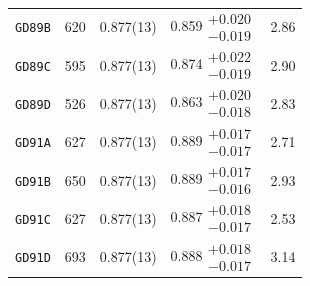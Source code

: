 \begin{table}
{\begin{tabular}{lcccc}
		\texttt{GD89B}	&	620 	&	0.877(13)	&	0.859$\substack{+0.020\\-0.019}$	&	2.86	\\
		\texttt{GD89C}	&	595 	&	0.877(13)	&	0.874$\substack{+0.022\\-0.019}$	&	2.90	\\
		\texttt{GD89D}	&	526 	&	0.877(13)	&	0.863$\substack{+0.020\\-0.018}$	&	2.83	\\
		\texttt{GD91A}	&	627 	&	0.877(13)	&	0.889$\substack{+0.017\\-0.017}$	&	2.71	\\
		\texttt{GD91B}	&	650 	&	0.877(13)	&	0.889$\substack{+0.017\\-0.016}$	&	2.93	\\
		\texttt{GD91C}	&	627 	&	0.877(13)	&	0.887$\substack{+0.018\\-0.017}$	&	2.53	\\
		\texttt{GD91D}	&	693 	&	0.877(13)	&	0.888$\substack{+0.018\\-0.017}$	&	3.14	\\
		\bottomrule
	\end{tabular}
}
\end{table}
